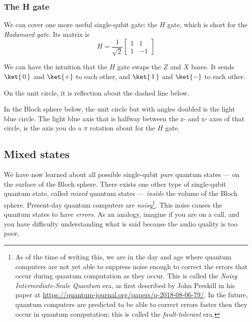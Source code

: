 \documentclass{article}
\theoremstyle{definition}
\newcommand{\kz}[1]{\ket{\,#1\,}}
\newcommand{\kx}[1]{\ket{#1}}
\begin{document}
\newpage
\subsubsection{The H gate}
We can cover one more useful single-qubit gate: the $H$ gate, which is short for the \textit{Hadamard gate}.  Its matrix is
\begin{equation}
	H = \frac{1}{\sqrt{2}}\begin{bmatrix}
		1 & 1\\
		1 & -1
	\end{bmatrix}
\end{equation}

We can have the intuition that the $H$ gate swaps the $Z$ and $X$ bases.
It sends $\kz0$ and $\kx+$ to each other, and $\kz1$ and $\kx-$ to each other.

On the unit circle, it is reflection about the dashed line below.
\begin{figure}[H]
	\label{fig:Hgate}
\end{figure}

In the Bloch sphere below, the unit circle but with angles doubled is the light blue circle.
The light blue axis that is halfway between the z- and x- axes of that circle, is the axis you do a $\pi$ rotation about for the $H$ gate.
\begin{figure}[H]
\end{figure}

\subsection{Mixed states}
We have now learned about all possible single-qubit \textit{pure} quantum states --- on the surface of the Bloch sphere.
There exists one other type of single-qubit quantum state, called \textit{mixed} quantum states --- \textit{inside} the volume of the Bloch sphere.
Present-day quantum computers are \textit{noisy}\footnote{As of the time of writing this, we are in the day and age where quantum computers are not yet able to suppress noise enough to correct the errors that occur during quantum computation as they occur.  This is called the \textit{Noisy Intermediate-Scale Quantum} era, as first described by John Preskill in his paper at \url{https://quantum-journal.org/papers/q-2018-08-06-79/}.  In the future, quantum computers are predicted to be able to correct errors faster then they occur in quantum computation; this is called the \textit{fault-tolerant} era.}.  This noise causes the quantum states to have \textit{errors}.  As an analogy, imagine if you are on a call, and you have difficulty understanding what is said because the audio quality is too poor.
\end{document}
